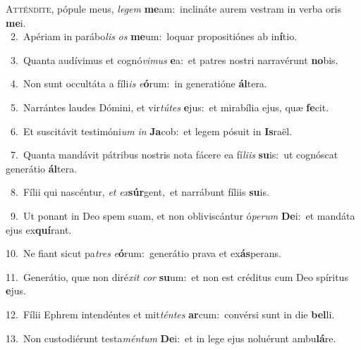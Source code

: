 \lettrine{\initial\textcolor{\initialcolor}{A}}{tténdite,} pópule meus, \textit{le}\-\textit{gem} \textbf{me}\-am:~\star inclináte aurem vestram in verba oris \textbf{me}\-i.\\
{\numbfont\textcolor{\numbcolor}{~2.}}~Apériam in parábo\textit{lis} \textit{os} \textbf{me}\-um:~\star loquar propositiónes ab in\-\textbf{í}\-tio.\par
{\numbfont\textcolor{\numbcolor}{~3.}}~Quanta audívimus et cognó\-\textit{vi}\-\textit{mus} \textbf{e}\-a:~\star et patres nostri narravérunt \textbf{no}\-bis.\par
{\numbfont\textcolor{\numbcolor}{~4.}}~Non sunt occultáta a fíli\textit{is} \textit{e}\-\textbf{ó}rum:~\star in generatióne \textbf{ál}\-tera.\par
{\numbfont\textcolor{\numbcolor}{~5.}}~Narrántes laudes Dómini, et vir\-\textit{tú}\-\textit{tes} \textbf{e}\-jus:~\star et mirabília ejus, quæ \textbf{fe}\-cit.\par
{\numbfont\textcolor{\numbcolor}{~6.}}~Et suscitávit testimóni\textit{um} \textit{in} \textbf{Ja}\-cob:~\star et legem pósuit in \textbf{Is}\-raël.\par
{\numbfont\textcolor{\numbcolor}{~7.}}~Quanta mandávit pátribus nostris nota fácere ea fí\-\textit{li}\-\textit{is} \textbf{su}\-is:~\star ut cognóscat generátio \textbf{ál}\-tera.\par
{\numbfont\textcolor{\numbcolor}{~8.}}~Fílii qui nascéntur, \textit{et} \textit{ex}\-\textbf{súr}gent,~\star et narrábunt fíliis \textbf{su}\-is.\par
{\numbfont\textcolor{\numbcolor}{~9.}}~Ut ponant in Deo spem suam, et non obliviscántur ó\-\textit{pe}\-\textit{rum} \textbf{De}\-i:~\star et mandáta ejus ex\-\textbf{quí}\-rant.\par
{\numbfont\textcolor{\numbcolor}{10.}}~Ne fiant sicut pa\textit{tres} \textit{e}\-\textbf{ó}rum:~\star generátio prava et ex\-\textbf{ás}\-perans.\par
{\numbfont\textcolor{\numbcolor}{11.}}~Generátio, quæ non diré\textit{xit} \textit{cor} \textbf{su}\-um:~\star et non est créditus cum Deo spíritus \textbf{e}\-jus.\par
{\numbfont\textcolor{\numbcolor}{12.}}~Fílii Ephrem intendéntes et mit\-\textit{tén}\-\textit{tes} \textbf{ar}\-cum:~\star convérsi sunt in die \textbf{bel}\-li.\par
{\numbfont\textcolor{\numbcolor}{13.}}~Non custodiérunt testa\-\textit{mén}\-\textit{tum} \textbf{De}\-i:~\star et in lege ejus noluérunt ambu\-\textbf{lá}\-re.\par
